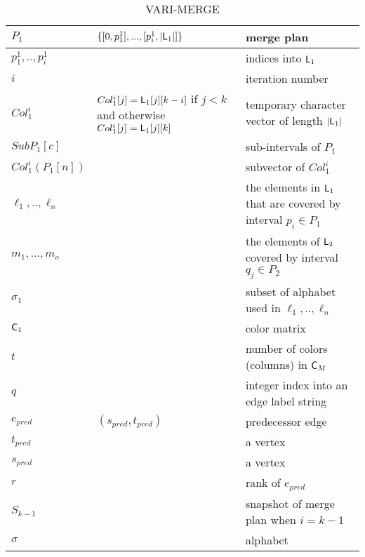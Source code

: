 \documentclass{article}
\begin{document}
\begin{table}
\begin{tabularx}{\textwidth}{|l|p{2in}|X|}
    $P_1 $ & $ \{[0, p^1_1],...,[p^1_i, |\mbox{\rm {\sf L}}_{1}|]\}$ & merge plan \\ \hline
    $p^1_1,..,p^1_i$ & & indices into  $\mbox{\rm {\sf L}}_{1}$ \\ \hline
    $i$ & & iteration number \\ \hline
    $Col_1^i$ &  $Col_1^i[j] = \mbox{\rm {\sf L}}_1[j][k-i]$ if $j < k$ and otherwise $Col_1^i[j] = \mbox{\rm {\sf L}}_1[j][k]$ & temporary character vector  of length $|\mbox{\rm {\sf L}}_1|$\\ \hline
    $SubP_1[c]$ & & sub-intervals of $P_1$ \\ \hline
    $Col_1^i(P_1[n])$ & & subvector of $Col_1^i$ \\ \hline
    $\ell_1,..,\ell_n$ & &  the elements in $\mbox{\rm {\sf L}}_1$ that are covered by interval $p_{i} \in P_1$\\ \hline
    $m_1,...,m_o$ & & the  elements of $\mbox{\rm {\sf L}}_2$ covered by interval $q_{j} \in P_2$ \\ \hline
    $\sigma_1$ & & subset of alphabet used in  $\ell_1,..,\ell_n$ \\ \hline
    $\mbox{\rm {\sf C}}_1$ & & color matrix \\ \hline
    $t$ & & number of colors (columns) in $\mbox{\rm {\sf C}}_M$ \\ \hline
    $q$ & & integer index into an edge label string \\ \hline
    $e_{pred}$ &  $ (s_{pred}, t_{pred})$ & predecessor edge \\ \hline
    $t_{pred}$ & & a vertex \\ \hline %
    $s_{pred}$ & & a vertex \\ \hline
    $r$ & & rank of  $e_{pred}$ \\ \hline
    $S_{k-1}$ & & snapshot of merge plan when $i=k-1$ \\ \hline
    $\sigma$ & & alphabet \\ \hline
    

    
    
   
  \end{tabularx}
  \caption{VARI-MERGE}
\end{table}
\end{document}
